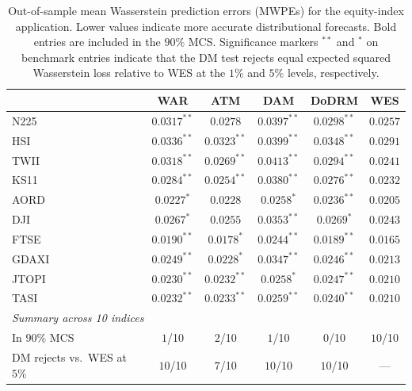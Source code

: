 \documentclass[a4paper, 11pt]{article}
\theoremstyle{definition}
\begin{document}
\begin{table}[t]
\centering
\small
\caption{Out-of-sample mean Wasserstein prediction errors (MWPEs) for the equity-index application. Lower values indicate more accurate distributional forecasts. Bold entries are included in the $90\%$ MCS. Significance markers $^{\ast\ast}$ and $^{\ast}$ on benchmark entries indicate that the DM test rejects equal expected squared Wasserstein loss relative to WES at the $1\%$ and $5\%$ levels, respectively.}
\label{tab:equity_oos_significance}
\begin{tabular}{lccccc}
\toprule
        & WAR                  & ATM                  & DAM                 & DoDRM                & WES \\
\midrule
N225    & $0.0317^{\ast\ast}$      & $\mathbf{0.0278}$    & $0.0397^{\ast\ast}$  & $0.0298^{\ast\ast}$  & $\mathbf{0.0257}$ \\
HSI     & $0.0336^{\ast\ast}$  & $0.0323^{\ast\ast}$  & $0.0399^{\ast\ast}$  & $0.0348^{\ast\ast}$  & $\mathbf{0.0291}$ \\
TWII    & $0.0318^{\ast\ast}$  & $0.0269^{\ast\ast}$  & $0.0413^{\ast\ast}$  & $0.0294^{\ast\ast}$  & $\mathbf{0.0241}$ \\
KS11    & $0.0284^{\ast\ast}$  & $0.0254^{\ast\ast}$  & $0.0380^{\ast\ast}$  & $0.0276^{\ast\ast}$  & $\mathbf{0.0232}$ \\
AORD    & $0.0227^{\ast}$      & $0.0228$             & $0.0258^{\ast}$      & $0.0236^{\ast\ast}$  & $\mathbf{0.0205}$ \\
DJI     & $\mathbf{0.0267}^{\ast}$ & $\mathbf{0.0255}$ & $\mathbf{0.0353}^{\ast\ast}$ & $0.0269^{\ast}$ & $\mathbf{0.0243}$ \\
FTSE    & $0.0190^{\ast\ast}$  & $0.0178^{\ast}$      & $0.0244^{\ast\ast}$  & $0.0189^{\ast\ast}$  & $\mathbf{0.0165}$ \\
GDAXI   & $0.0249^{\ast\ast}$  & $0.0228^{\ast}$      & $0.0347^{\ast\ast}$  & $0.0246^{\ast\ast}$  & $\mathbf{0.0213}$ \\
JTOPI   & $0.0230^{\ast\ast}$  & $0.0232^{\ast\ast}$  & $0.0258^{\ast}$      & $0.0247^{\ast\ast}$  & $\mathbf{0.0210}$ \\
TASI    & $0.0232^{\ast\ast}$  & $0.0233^{\ast\ast}$  & $0.0259^{\ast\ast}$  & $0.0240^{\ast\ast}$  & $\mathbf{0.0210}$ \\
\midrule
\multicolumn{6}{l}{\emph{Summary across 10 indices}} \\
In $90\%$ MCS                & $1$/10 & $2$/10 & $1$/10 & $0$/10 & $10$/10 \\
DM rejects vs.\ WES at $5\%$ & $10$/10 & $7$/10 & $10$/10 & $10$/10 & --- \\
\bottomrule
\end{tabular}

\end{table}
\end{document}
